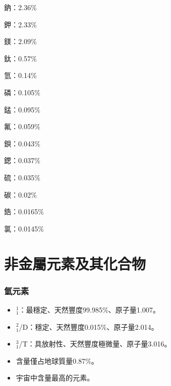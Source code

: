 \documentclass[a4paper,12pt]{report}
\begin{document}
\item 鈉：2.36\%
\item 鉀：2.33\%
\item 鎂：2.09\%
\item 鈦：0.57\%
\item 氫：0.14\%
\item 磷：0.105\%
\item 錳：0.095\%
\item 氟：0.059\%
\item 鋇：0.043\%
\item 鍶：0.037\%
\item 硫：0.035\%
\item 碳：0.02\%
\item 鋯：0.0165\%
\item 氯：0.0145\%
\een


\section{非金屬元素及其化合物}
\subsubsection{氫元素}
\begin{itemize}
\item {}$^1_1$\rmH：最穩定、天然豐度99.985\%、原子量1.007。
\item {}$^2_1$\rmH/D：穩定、天然豐度0.015\%、原子量2.014。
\item {}$^3_1$\rmH/T：具放射性、天然豐度極微量、原子量3.016。
\item 含量僅占地球質量0.87\%。
\item 宇宙中含量最高的元素。
\end{itemize}
\end{document}
